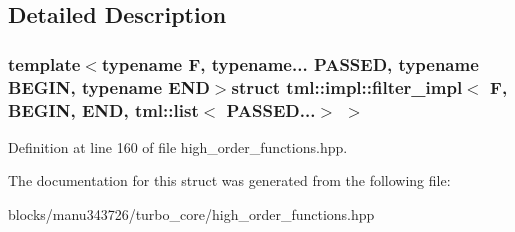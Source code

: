 \subsection{Detailed Description}
\subsubsection*{template$<$typename F, typename... P\+A\+S\+S\+E\+D, typename B\+E\+G\+I\+N, typename E\+N\+D$>$struct tml\+::impl\+::filter\+\_\+impl$<$ F, B\+E\+G\+I\+N, E\+N\+D, tml\+::list$<$ P\+A\+S\+S\+E\+D...$>$ $>$}



Definition at line 160 of file high\+\_\+order\+\_\+functions.\+hpp.



The documentation for this struct was generated from the following file\+:\begin{DoxyCompactItemize}
\item 
blocks/manu343726/turbo\+\_\+core/high\+\_\+order\+\_\+functions.\+hpp\end{DoxyCompactItemize}
